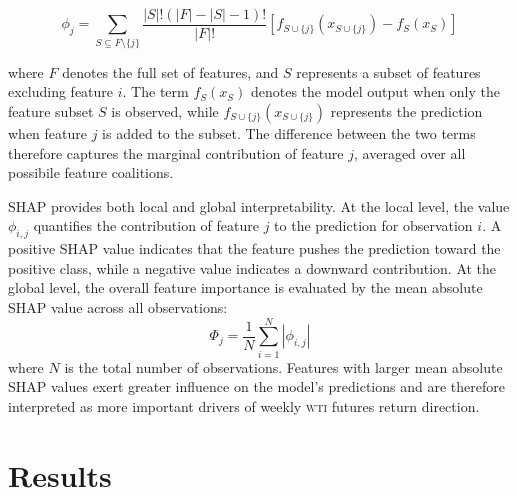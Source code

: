 \documentclass[preprint,12pt,authoryear]{elsarticle}
\newcommand{\wti}{\textsc{wti}}
\begin{document}
\begin{equation}
\phi_j =
\sum_{S \subseteq F \setminus \{j\}}
\frac{|S|!(|F|-|S|-1)!}{|F|!}
\left[
f_{S \cup \{j\}}(x_{S \cup \{j\}})
-
f_S(x_S)
\right]
\end{equation}

where $F$ denotes the full set of features, and $S$ represents a subset of
features excluding feature $i$. The term $f_S(x_S)$ denotes the model
output when only the feature subset $S$ is observed, while
$f_{S \cup \{j\}}(x_{S \cup \{j\}})$ represents the prediction when feature
$j$ is added to the subset. The difference between the two terms therefore captures the marginal contribution of feature $j$, averaged over all possibile feature coalitions.

SHAP provides both local and global interpretability. At the local
level, the value $\phi_{i,j}$ quantifies the contribution of
feature $j$ to the prediction for observation $i$. A positive SHAP value
indicates that the feature pushes the prediction toward the positive class, while a negative value indicates a downward contribution. At the global level, the overall feature importance is evaluated by the mean absolute SHAP value across all observations:
\begin{equation}
\Phi_j =
\frac{1}{N}
\sum_{i=1}^{N}
|\phi_{i,j}|
\end{equation}
where $N$ is the total number of observations. Features with larger mean absolute SHAP values exert greater influence on the model's predictions and are therefore interpreted as more important drivers of weekly \wti{} futures return direction.


\section{Results}
\label{SecResults}
\end{document}
